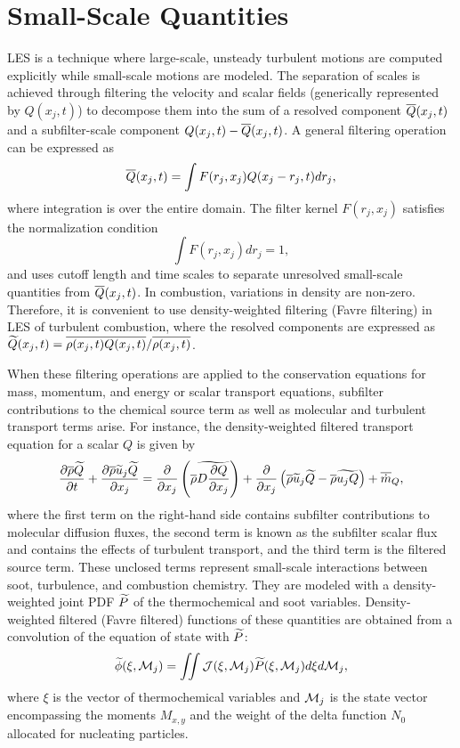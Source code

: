\section{Small-Scale Quantities}
\label{sec:lesmodels:presumedpdf}

LES is a technique where large-scale, unsteady turbulent motions are computed explicitly while small-scale motions are modeled. The separation of scales is achieved through filtering the velocity and scalar fields (generically represented by $Q(x_j,t)$) to decompose them into the sum of a resolved component $\mean{Q}(x_j,t)$ and a subfilter-scale component $Q(x_j,t)-\mean{Q}(x_j,t)$. A general filtering operation can be expressed as
\begin{equation}\label{eq:lesmodels:presumedpdf:filter}
  \mean{Q}(x_j,t) = \int F(r_j,x_j)Q(x_j - r_j, t)dr_j,
\end{equation}
where integration is over the entire domain. The filter kernel $F(r_j,x_j)$ satisfies the normalization condition
\begin{equation}\label{eq:lesmodels:presumedpdf:kernel}
  \int F(r_j,x_j)dr_j = 1,
\end{equation}
and uses cutoff length and time scales to separate unresolved small-scale quantities from $\mean{Q}(x_j,t)$. In combustion, variations in density are non-zero. Therefore, it is convenient to use density-weighted filtering (Favre filtering) in LES of turbulent combustion, where the resolved components are expressed as $\tf{Q}(x_j,t) = \mean{\rho(x_j,t)Q(x_j,t)}/\mean{\rho(x_j,t)}$.

When these filtering operations are applied to the conservation equations for mass, momentum, and energy or scalar transport equations, subfilter contributions to the chemical source term as well as molecular and turbulent transport terms arise. For instance, the density-weighted filtered transport equation for a scalar $Q$ is given by
\begin{equation}\label{eq:lesmodels:presumedpdf:scalar}
  \ftrder{\tf{Q}} = \pder[]{x_j}\left( \mean{\rho}\tf{D\pder[Q]{x_j}} \right) + \dsff[\tf{Q}]{\tf{u_j Q}} + \fst[m]{Q},
\end{equation}
where the first term on the right-hand side contains subfilter contributions to molecular diffusion fluxes, the second term is known as the subfilter scalar flux and contains the effects of turbulent transport, and the third term is the filtered source term. These unclosed terms represent small-scale interactions between soot, turbulence, and combustion chemistry. They are modeled with a density-weighted joint PDF $\tf{P}$ of the thermochemical and soot variables. Density-weighted filtered (Favre filtered) functions of these quantities are obtained from a convolution of the equation of state with $\tf{P}$:
\begin{equation}\label{eq:lesmodels:presumedpdf:filteredfuncs}
  \tf{\phi}(\xi,\mc{M}_j) = \iint \mc{J}(\xi,\mc{M}_j)\tf{P}(\xi,\mc{M}_j) d\xi d\mc{M}_j,
\end{equation}
where $\xi$ is the vector of thermochemical variables and $\mc{M}_j$ is the state vector encompassing the moments $M_{x,y}$ and the weight of the delta function $N_0$ allocated for nucleating particles.

